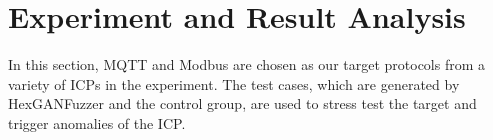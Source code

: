 \section{Experiment and Result Analysis}
In this section, MQTT and Modbus are chosen as our target protocols from a variety of ICPs in the experiment. The test cases, which are generated by HexGANFuzzer and the control group, are used to stress test the target and trigger anomalies of the ICP.%

%
%
%
%

